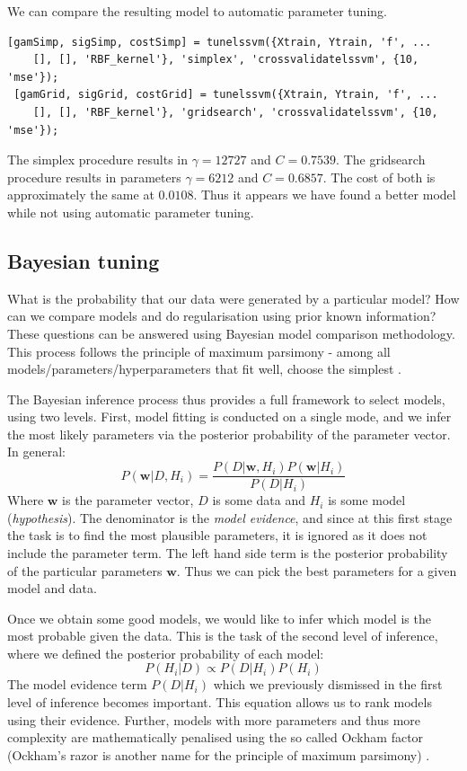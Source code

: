 \documentclass[10pt,a4paper]{article}
\begin{document}
We can compare the resulting model to automatic parameter tuning.

\begin{lstlisting}[style=Matlab-editor]
[gamSimp, sigSimp, costSimp] = tunelssvm({Xtrain, Ytrain, 'f', ...
    [], [], 'RBF_kernel'}, 'simplex', 'crossvalidatelssvm', {10, 'mse'});
 [gamGrid, sigGrid, costGrid] = tunelssvm({Xtrain, Ytrain, 'f', ...
    [], [], 'RBF_kernel'}, 'gridsearch', 'crossvalidatelssvm', {10, 'mse'});
\end{lstlisting}

The simplex procedure results in $\gamma=12727$ and $C=0.7539$. The gridsearch procedure results in parameters $\gamma=6212$ and $C=0.6857$. The cost of both is approximately the same at $0.0108$. Thus it appears we have found a better model while not using automatic parameter tuning.

\subsection{Bayesian tuning}
What is the probability that our data were generated by a particular model? How can we compare models and do regularisation using prior known information? These questions can be answered using Bayesian model comparison methodology. This process follows the principle of maximum parsimony - among all models/parameters/hyperparameters that fit well, choose the simplest \cite{MacKay91bayesianinterpolation}.

The Bayesian inference process thus provides a full framework to select models, using two levels. First, model fitting is conducted on a single mode, and we infer the most likely parameters via the posterior probability of the parameter vector. In general:
$$
P(\mathbf{w} | D, H_i) = \frac{P(D | \mathbf{w}, H_i)P(\mathbf{w} | H_i)}{P(D | H_i)}
$$
Where $\mathbf{w}$ is the parameter vector, $D$ is some data and $H_i$ is some model (\textit{hypothesis}). The denominator is the \textit{model evidence}, and since at this first stage the task is to find the most plausible parameters, it is ignored as it does not include the parameter term. The left hand side term is the posterior probability of the particular parameters $\mathbf{w}$. Thus we can pick the best parameters for a given model and data.

Once we obtain some good models, we would like to infer which model is the most probable given the data. This is the task of the second level of inference, where we defined the posterior probability of each model:
$$
P(H_i | D) \propto P(D | H_i)P(H_i)
$$
The model evidence term $P(D | H_i)$ which we previously dismissed in the first level of inference becomes important. This equation allows us to rank models using their evidence. Further, models with more parameters and thus more complexity are mathematically penalised using the so called Ockham factor (Ockham's razor is another name for the principle of maximum parsimony) \cite{MacKay91bayesianinterpolation}.
\end{document}
